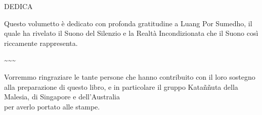\cleartorecto
\thispagestyle{empty}

\mbox{}
\vfill

{\centering
\setlength{\parskip}{5pt}%
\footnotesize

{\large\chapterTitleFont\color{chaptertitle} DEDICA}

\bigskip

Questo volumetto è dedicato con profonda gratitudine a Luang Por
Sumedho, il quale ha rivelato il Suono del Silenzio e la Realtà
Incondizionata che il Suono così riccamente rappresenta.

\textasciitilde{}\textasciitilde{}\textasciitilde{}

Vorremmo ringraziare le tante persone che hanno contribuito con il loro
sostegno alla preparazione di questo libro, e in particolare il gruppo
Kataññuta della Malesia, di Singapore e dell'Australia\\
per averlo portato alle stampe.

}

\vfill
\mbox{}